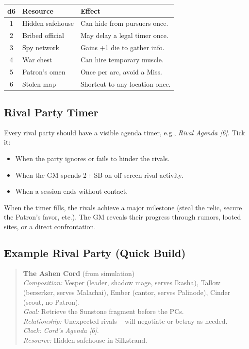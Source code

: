 \begin{tcolorbox}[title=Additional Resource (off-screen), colback=white!97!gray, colframe=black!80!gray,breakable]
\centering
\begin{tabular}{cll}
\toprule
\textbf{d6} & \textbf{Resource} & \textbf{Effect} \\
\midrule
1 & Hidden safehouse & Can hide from pursuers once. \\
2 & Bribed official & May delay a legal timer once. \\
3 & Spy network & Gains +1 die to gather info. \\
4 & War chest & Can hire temporary muscle. \\
5 & Patron's omen & Once per arc, avoid a Miss. \\
6 & Stolen map & Shortcut to any location once. \\
\bottomrule
\end{tabular}
\end{tcolorbox}

\subsection*{Rival Party Timer }
Every rival party should have a visible agenda timer, e.g., \emph{Rival Agenda [6]}. Tick it:
\begin{itemize}
  \item When the party ignores or fails to hinder the rivals.
  \item When the GM spends 2+ SB on off-screen rival activity.
  \item When a session ends without contact.
\end{itemize}
When the timer fills, the rivals achieve a major milestone (steal the relic, secure the Patron's favor, etc.). The GM reveals their progress through rumors, looted sites, or a direct confrontation.

\subsection*{Example Rival Party (Quick Build)}
\begin{quote}
\textbf{The Ashen Cord} (from simulation)\\
\emph{Composition:} Vesper (leader, shadow mage, serves Ikasha), Tallow (berserker, serves Malachai), Ember (cantor, serves Palinode), Cinder (scout, no Patron).\\
\emph{Goal:} Retrieve the Sunstone fragment before the PCs.\\
\emph{Relationship:} Unexpected rivals -- will negotiate or betray as needed.\\
\emph{Clock:} \emph{Cord's Agenda [6]}.\\
\emph{Resource:} Hidden safehouse in Silkstrand.
\end{quote}

